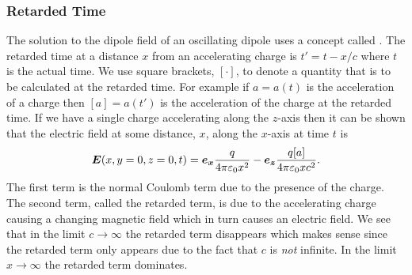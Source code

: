     \subsubsection{Retarded Time}
    The solution to the dipole field of an oscillating dipole uses a concept called .
    The retarded time at a distance \(x\) from an accelerating charge is \(t' = t - x/c\) where \(t\) is the actual time.
    We use square brackets, \([\cdot]\), to denote a quantity that is to be calculated at the retarded time.
    For example if \(a = a(t)\)  is the acceleration of a charge then \([a] = a(t')\) is the acceleration of the charge at the retarded time.
    If we have a single charge accelerating along the \(z\)-axis then it can be shown that the electric field at some distance, \(x\), along the \(x\)-axis at time \(t\) is
    \[\bm{E}(x, y=0, z=0, t) = \bm{e_{x}}\frac{q}{4\pi\varepsilon_0 x^2} - \bm{e_{z}}\frac{q[a]}{4\pi\varepsilon_0 xc^2}.\]
    The first term is the normal Coulomb term due to the presence of the charge.
    The second term, called the retarded term, is due to the accelerating charge causing a changing magnetic field which in turn causes an electric field.
    We see that in the limit \(c\to\infty\) the retarded term disappears which makes sense since the retarded term only appears due to the fact that \(c\) is \emph{not} infinite.
    In the limit \(x\to\infty\) the retarded term dominates.
    
